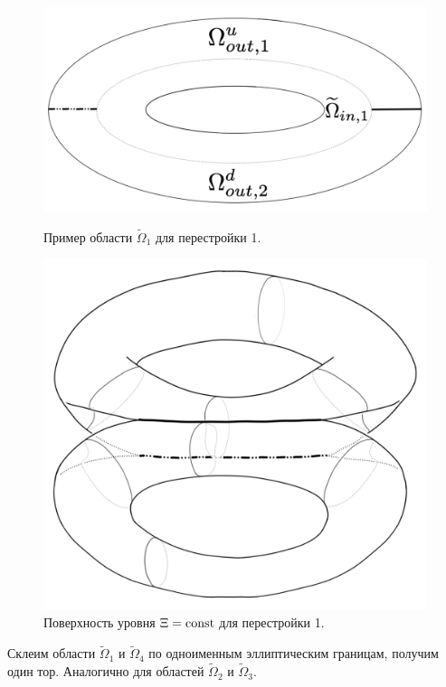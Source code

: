 \begin{figure}[!htb]
\centering
\includegraphics[scale=0.125]{images/section2/atoms/domain_atom_ell_foc.pdf}
    \caption{Пример области $\widetilde{\Omega}_1$ для перестройки 1.}
    \label{fig:pt9:_domain_atom_ell_foc}
\endminipage\hfill
{}
\centering
\includegraphics[scale=0.125]{images/section2/atoms/atom1_result.pdf}
    \caption{Поверхность уровня $\Xi=\mathrm{const}$ для перестройки 1.}
    \label{fig:pt9:_atom1_result}
\endminipage\hfill
\end{figure}


Склеим области $\widetilde{\Omega}_1$ и $\widetilde{\Omega}_4$ по одноименным эллиптическим границам, получим один тор. Аналогично для областей $\widetilde{\Omega}_2$ и $\widetilde{\Omega}_3$.


